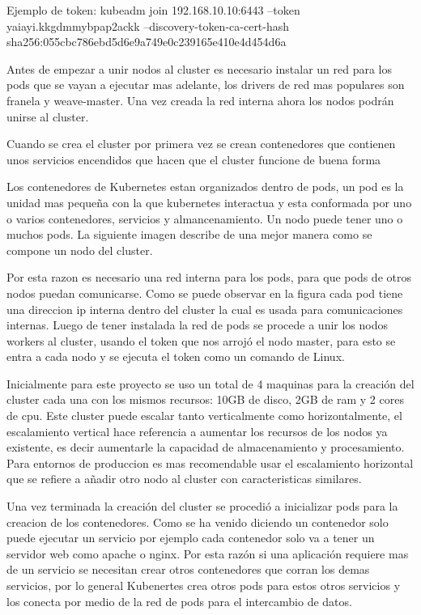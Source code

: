      Ejemplo de token: kubeadm join 192.168.10.10:6443 --token yaiayi.kkgdmmybpap2ackk --discovery-token-ca-cert-hash sha256:055cbc786ebd5d6e9a749e0c239165e410e4d454d6a

     
     Antes de empezar a unir nodos al cluster es necesario instalar un red para los pods que se vayan a ejecutar mas adelante, los drivers de red mas populares son franela y weave-master.
     Una vez creada la red interna ahora los nodos podrán unirse al cluster.
     
     Cuando se crea el cluster por primera vez se crean contenedores que contienen unos servicios encendidos que hacen que el cluster funcione de buena forma
     
     Los contenedores de Kubernetes estan organizados dentro de pods, un pod es la unidad mas pequeña con la que kubernetes interactua y esta conformada por uno o varios contenedores, servicios y almancenamiento. Un nodo puede tener uno o muchos pods. La siguiente imagen describe de una mejor manera como se compone un nodo del cluster.
      
      
      Por esta razon es necesario una red interna para los pods, para que pods de otros nodos puedan comunicarse.
      Como se puede observar en la figura cada pod tiene una direccion ip interna dentro del cluster la cual es usada para comunicaciones internas.
      Luego de tener instalada la red de pods se procede a unir los nodos workers al cluster, usando el token que nos arrojó el nodo master, para esto se entra a cada nodo y se ejecuta el token como un comando de Linux.
      
      Inicialmente para este proyecto se uso un total de 4 maquinas para la creación del cluster cada una con los mismos recursos: 10GB de disco, 2GB de ram y 2 cores de cpu.
      Este cluster puede escalar tanto verticalmente como horizontalmente, el escalamiento vertical hace referencia a aumentar los recursos de los nodos ya existente, es decir aumentarle la capacidad de almacenamiento y procesamiento. Para entornos de produccion es mas recomendable usar el escalamiento horizontal que se refiere a añadir otro nodo al cluster con caracteristicas similares.
      
      Una vez terminada la creación del cluster se procedió a inicializar pods para la creacion de los contenedores. Como se ha venido diciendo un contenedor solo puede ejecutar un servicio por ejemplo cada contenedor solo va a tener un servidor web como apache o nginx.
     Por esta razón si una aplicación requiere mas de un servicio se necesitan crear otros contenedores que corran los demas servicios, por lo general Kubenertes crea otros pods para estos otros servicios y los conecta por medio de la red de pods para el intercambio de datos.
     
